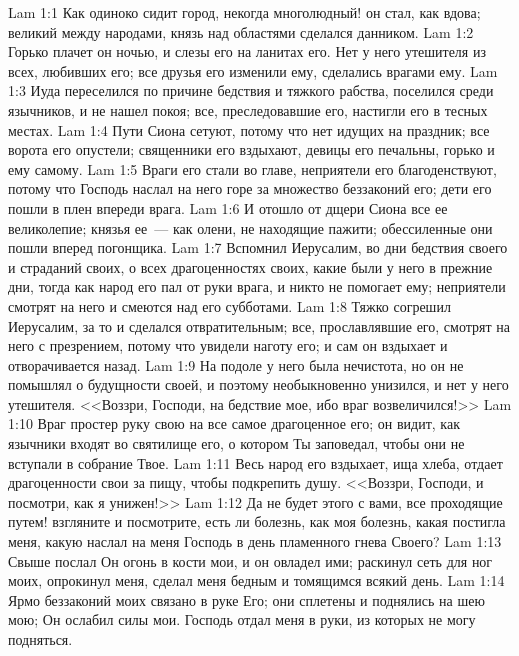 \vs Lam 1:1 Как одиноко сидит город, некогда многолюдный! он стал, как вдова; великий между народами, князь над областями сделался данником.
\vs Lam 1:2 Горько плачет он ночью, и слезы его на ланитах его. Нет у него утешителя из всех, любивших его; все друзья его изменили ему, сделались врагами ему.
\vs Lam 1:3 Иуда переселился по причине бедствия и тяжкого рабства, поселился среди язычников, и не нашел покоя; все, преследовавшие его, настигли его в тесных местах.
\vs Lam 1:4 Пути Сиона сетуют, потому что нет идущих на праздник; все ворота его опустели; священники его вздыхают, девицы его печальны, горько и ему самому.
\vs Lam 1:5 Враги его стали во главе, неприятели его благоденствуют, потому что Господь наслал на него горе за множество беззаконий его; дети его пошли в плен впереди врага.
\vs Lam 1:6 И отошло от дщери Сиона все ее великолепие; князья ее~--- как олени, не находящие пажити; обессиленные они пошли вперед погонщика.
\vs Lam 1:7 Вспомнил Иерусалим, во дни бедствия своего и страданий своих, о всех драгоценностях своих, какие были у него в прежние дни, тогда как народ его пал от руки врага, и никто не помогает ему; неприятели смотрят на него и смеются над его субботами.
\vs Lam 1:8 Тяжко согрешил Иерусалим, за то и сделался отвратительным; все, прославлявшие его, смотрят на него с презрением, потому что увидели наготу его; и сам он вздыхает и отворачивается назад.
\vs Lam 1:9 На подоле у него была нечистота, но он не помышлял о будущности своей, и поэтому необыкновенно унизился, и нет у него утешителя. <<Воззри, Господи, на бедствие мое, ибо враг возвеличился!>>
\vs Lam 1:10 Враг простер руку свою на все самое драгоценное его; он видит, как язычники входят во святилище его, о котором Ты заповедал, чтобы они не вступали в собрание Твое.
\vs Lam 1:11 Весь народ его вздыхает, ища хлеба, отдает драгоценности свои за пищу, чтобы подкрепить душу. <<Воззри, Господи, и посмотри, как я унижен!>>
\vs Lam 1:12 Да не будет этого с вами, все проходящие путем! взгляните и посмотрите, есть ли болезнь, как моя болезнь, какая постигла меня, какую наслал на меня Господь в день пламенного гнева Своего?
\vs Lam 1:13 Свыше послал Он огонь в кости мои, и он овладел ими; раскинул сеть для ног моих, опрокинул меня, сделал меня бедным и томящимся всякий день.
\vs Lam 1:14 Ярмо беззаконий моих связано в руке Его; они сплетены и поднялись на шею мою; Он ослабил силы мои. Господь отдал меня в руки, из которых не могу подняться.
